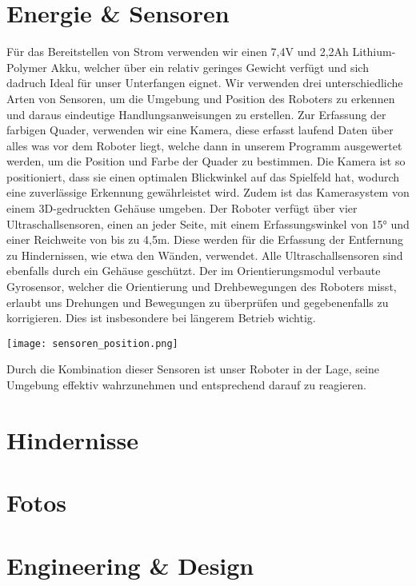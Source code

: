 \documentclass{article}
\begin{document}
\section{Energie \& Sensoren}
Für das Bereitstellen von Strom verwenden wir einen 7,4V und 2,2Ah Lithium-Polymer Akku, welcher über ein relativ geringes Gewicht verfügt
und sich dadruch Ideal für unser Unterfangen eignet.\newline
Wir verwenden drei unterschiedliche Arten von Sensoren, um die Umgebung und Position des Roboters zu erkennen und daraus eindeutige Handlungsanweisungen
zu erstellen.\newline
Zur Erfassung der farbigen Quader, verwenden wir eine Kamera, diese erfasst laufend Daten über alles was vor dem Roboter liegt,
welche dann in unserem Programm ausgewertet werden, um die Position und Farbe der Quader zu bestimmen.
Die Kamera ist so positioniert, dass sie einen optimalen Blickwinkel auf das Spielfeld hat,
wodurch eine zuverlässige Erkennung gewährleistet wird.
Zudem ist das Kamerasystem von einem 3D-gedruckten Gehäuse umgeben.\newline
Der Roboter verfügt über vier Ultraschallsensoren, einen an jeder Seite, mit einem Erfassungswinkel von 15°
und einer Reichweite von bis zu 4,5m.
Diese werden für die Erfassung der Entfernung zu Hindernissen, wie etwa den Wänden, verwendet.
Alle Ultraschallsensoren sind ebenfalls durch ein Gehäuse geschützt.\newline
Der im Orientierungsmodul verbaute Gyrosensor, welcher die Orientierung und Drehbewegungen des Roboters misst,
erlaubt uns Drehungen und Bewegungen zu überprüfen und gegebenenfalls zu korrigieren.
Dies ist insbesondere bei längerem Betrieb wichtig.
\begin{center}
  \texttt{[image: sensoren\_position.png]}
\end{center} 
Durch die Kombination dieser Sensoren ist unser Roboter in der Lage, seine Umgebung effektiv wahrzunehmen
und entsprechend darauf zu reagieren.

\section{Hindernisse}

\section{Fotos}

\section{Engineering \& Design}
\end{document}
